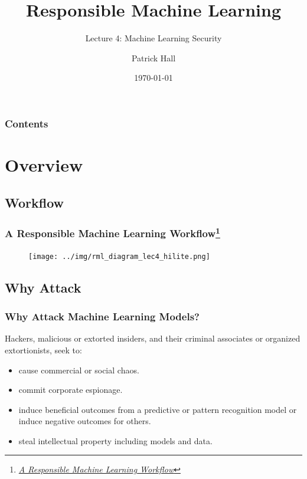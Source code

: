 \documentclass[11pt,
               aspectratio=169,
               hyperref={colorlinks}
               ]{beamer}
\author{Patrick Hall}
\title{Responsible Machine Learning}
\subtitle{Lecture 4: Machine Learning Security}
\institute{The George Washington University}
\date{\today}
\begin{document}
	
	\maketitle
	
	\begin{frame}
	
		\frametitle{Contents}
		
		\tableofcontents{}
		
	\end{frame}
	
	
	\section{Overview}
		\subsection{Workflow} %
			
		\begin{frame}
		
			\frametitle{A Responsible Machine Learning Workflow\footnote{\href{https://www.mdpi.com/2078-2489/11/3/137/htm}{\textit{A Responsible Machine Learning Workflow}}}}
			
			\begin{figure}[htb]
				\begin{center}
					\texttt{[image: ../img/rml\_diagram\_lec4\_hilite.png]}
					\label{fig:blueprint}
				\end{center}
			\end{figure}		
					
		\end{frame}	


		\subsection{Why Attack}

		\begin{frame}
		
			\frametitle{Why Attack Machine Learning Models?}
Hackers, malicious or extorted insiders, and their criminal associates or organized extortionists, seek to:
				\begin{itemize}
					\item cause commercial or social chaos.
					\item commit corporate espionage.
					\item induce beneficial outcomes from a predictive or pattern recognition model or induce negative outcomes for others. %
					\item steal intellectual property including models and data.
				\end{itemize}	
			\end{frame}
\end{document}
